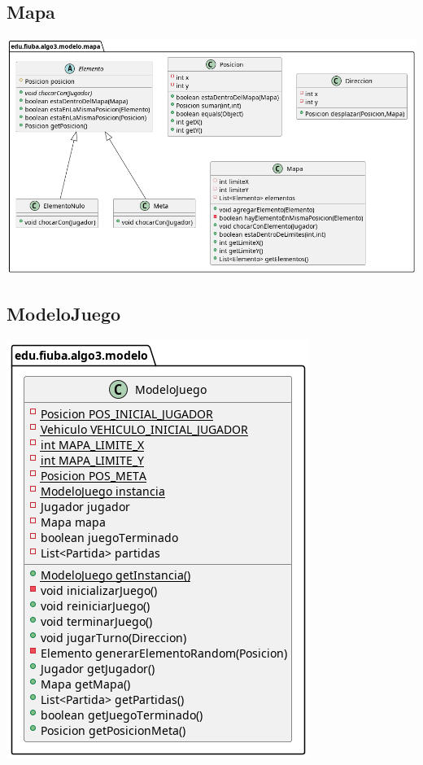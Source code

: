\documentclass[titlepage,a4paper]{article}
\begin{document}
\subsection{Mapa}
\label{sec:orgbf8a59a}

\begin{center}
\includegraphics[width=.9\linewidth]{./diagramas/clases-mapa.png}
\end{center}

\subsection{ModeloJuego}
\label{sec:orgd94c462}

\begin{center}
\includegraphics[width=.9\linewidth]{./diagramas/clases-modelojuego.png}
\end{center}
\end{document}
